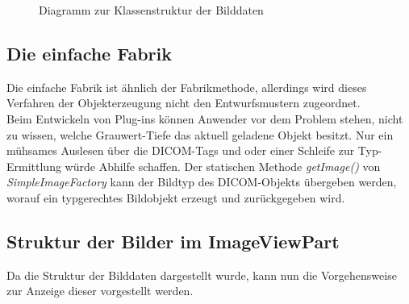 \begin{figure}[htbp]
  \vspace{0.5cm}
  \centering
  \caption{Diagramm zur Klassenstruktur der Bilddaten}
  \label{imagemodel}
  \vspace{0.5cm}
\end{figure}

\subsection{Die einfache Fabrik}

Die einfache Fabrik ist ähnlich der Fabrikmethode, allerdings wird dieses Verfahren der Objekterzeugung nicht den Entwurfsmustern zugeordnet.\\
Beim Entwickeln von Plug-ins können Anwender vor dem Problem stehen, nicht zu wissen, welche Grauwert-Tiefe das aktuell geladene Objekt besitzt. Nur ein mühsames Auslesen über die DICOM-Tags und oder einer Schleife zur Typ-Ermittlung würde Abhilfe schaffen. Der statischen Methode \textit{getImage()} von \textit{SimpleImageFactory} kann der Bildtyp des DICOM-Objekts übergeben werden, worauf ein typgerechtes Bildobjekt erzeugt und zurückgegeben wird.

\subsection{Struktur der Bilder im ImageViewPart}

Da die Struktur der Bilddaten dargestellt wurde, kann nun die Vorgehensweise zur Anzeige dieser vorgestellt werden.\\

